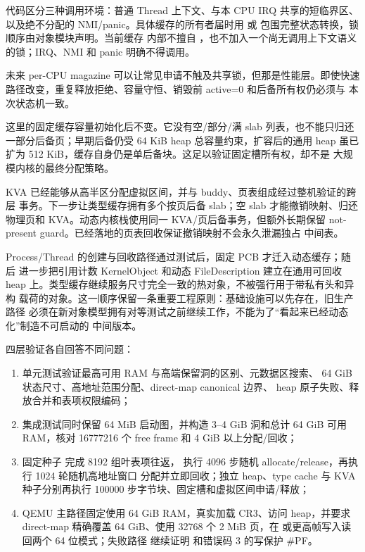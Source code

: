 代码区分三种调用环境：普通 Thread 上下文、与本 CPU IRQ 共享的短临界区、
以及绝不分配的 NMI/panic。具体缓存的所有者届时用  或
 包围完整状态转换，锁顺序由对象模块声明。当前缓存
内部不擅自 ，也不加入一个尚无调用上下文语义的锁；IRQ、NMI 和
panic 明确不得调用。

未来 per-CPU magazine 可以让常见申请不触及共享锁，但那是性能层。即使快速
路径改变，重复释放拒绝、容量守恒、销毁前 active=0 和后备所有权仍必须与
本次状态机一致。

这里的固定缓存容量初始化后不变。它没有空/部分/满 slab 列表，也不能只归还
一部分后备页；早期后备仍受 64 KiB heap 总容量约束，扩容后的通用 heap
虽已扩为 512 KiB，缓存自身仍是单后备块。这足以验证固定槽所有权，却不是
大规模内核的最终分配策略。

KVA 已经能够从高半区分配虚拟区间，并与 buddy、页表组成经过整机验证的跨层
事务。下一步让类型缓存拥有多个按页后备 slab；空 slab 才能撤销映射、归还
物理页和 KVA。动态内核栈使用同一 KVA/页后备事务，但额外长期保留
not-present guard。已经落地的页表回收保证撤销映射不会永久泄漏独占
中间表。

Process/Thread 的创建与回收路径通过测试后，固定 PCB 才迁入动态缓存；随后
进一步把引用计数 KernelObject 和动态 FileDescription 建立在通用可回收
heap 上。类型缓存继续服务尺寸完全一致的热对象，不被强行用于带私有头和异构
载荷的对象。这一顺序保留一条重要工程原则：基础设施可以先存在，旧生产路径
必须在新对象模型拥有对等测试之前继续工作，不能为了“看起来已经动态化”制造不可启动的
中间版本。

四层验证各自回答不同问题：

\begin{enumerate}[label=\arabic*.]
  \item 单元测试验证最高可用 RAM 与高端保留洞的区别、元数据区搜索、
        64 GiB 状态尺寸、高地址范围分配、direct-map canonical 边界、
        heap 原子失败、释放合并和表项权限编码；
  \item 集成测试同时保留 64 MiB 启动图，并构造 3--4 GiB 洞和总计 64 GiB
        可用 RAM，核对 16777216 个 free frame 和 4 GiB 以上分配/回收；
  \item 固定种子  完成 8192 组叶表项往返，
        执行 4096 步随机 allocate/release，再执行 1024 轮随机高地址窗口
        分配并立即回收；独立 heap、type cache 与 KVA 种子分别再执行
        100000 步字节块、固定槽和虚拟区间申请/释放；
  \item QEMU 主路径固定使用 64 GiB RAM，真实加载 CR3、访问 heap，并要求
        direct-map 精确覆盖 64 GiB、使用 32768 个 2 MiB 页，在
         或更高帧写入读回两个 64 位模式；失败路径
        继续证明  和错误码 3 的写保护 \#PF。
\end{enumerate}

